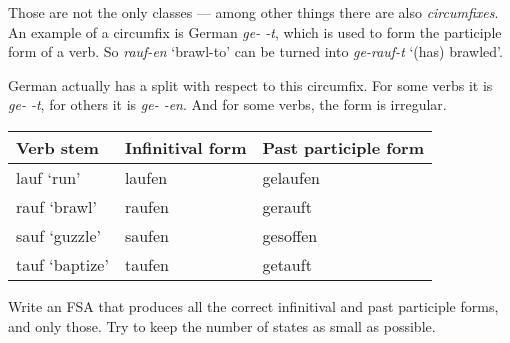 Those are not the only classes --- among other things there are also \emph{circumfixes}. 
An example of a circumfix is German \emph{ge- -t}, which is used to form the participle form of a verb.
So \emph{rauf-en} `brawl-to' can be turned into \emph{ge-rauf-t} `(has) brawled'.

\medskip
\begin{homework}
    German actually has a split with respect to this circumfix.
    For some verbs it is \emph{ge- -t}, for others it is \emph{ge- -en}.
    And for some verbs, the form is irregular.
    \begin{center}
        \begin{tabular}{lll}
            \toprule
            \textbf{Verb stem}
            &
            \textbf{Infinitival form}
            &
            \textbf{Past participle form}\\
            \midrule
            lauf `run'& laufen & gelaufen\\
            rauf `brawl' & raufen & gerauft\\
            sauf `guzzle' & saufen & gesoffen\\
            tauf `baptize' & taufen & getauft\\
            \bottomrule
        \end{tabular}
    \end{center}
    Write an FSA that produces all the correct infinitival and past participle forms, and only those.
    Try to keep the number of states as small as possible.
\end{homework}

